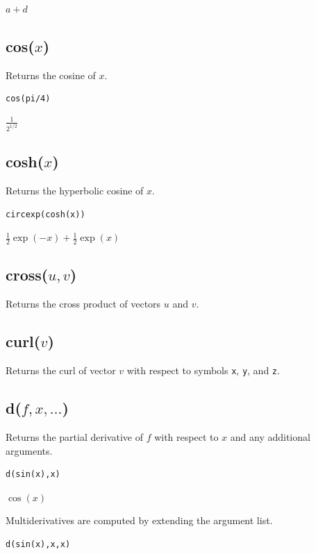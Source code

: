 \documentclass[12pt]{article}
\begin{document}
\noindent
$a + d$

\subsection*{cos($x$)}

Returns the cosine of $x$.

{\color{blue}
\begin{verbatim}
cos(pi/4)
\end{verbatim}
}

\noindent
$\displaystyle \frac{1}{2^{1/2}}$

\subsection*{cosh($x$)}

Returns the hyperbolic cosine of $x$.

{\color{blue}
\begin{verbatim}
circexp(cosh(x))
\end{verbatim}
}

\noindent
$\tfrac{1}{2}\exp(-x)+\tfrac{1}{2}\exp(x)$

\subsection*{cross($u,v$)}

Returns the cross product of vectors $u$ and $v$.

\subsection*{curl($v$)}

Returns the curl of vector $v$ with respect to symbols \verb$x$, \verb$y$, and \verb$z$.

\subsection*{d($f,x,\ldots$)}

Returns the partial derivative of $f$ with respect to $x$ and any additional arguments.

{\color{blue}
\begin{verbatim}
d(sin(x),x)
\end{verbatim}
}

\noindent
$\cos(x)$

\bigskip
\noindent
Multiderivatives are computed by extending the argument list.

{\color{blue}
\begin{verbatim}
d(sin(x),x,x)
\end{verbatim}
}
\end{document}
